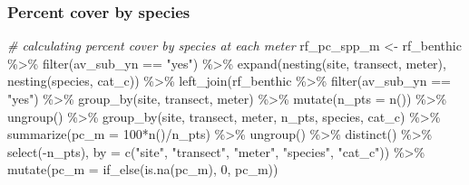\documentclass[
]{article}
\newenvironment{Shaded}{\begin{snugshade}}{\end{snugshade}}
\newcommand{\AttributeTok}[1]{\textcolor[rgb]{0.77,0.63,0.00}{#1}}
\newcommand{\CommentTok}[1]{\textcolor[rgb]{0.56,0.35,0.01}{\textit{#1}}}
\newcommand{\DecValTok}[1]{\textcolor[rgb]{0.00,0.00,0.81}{#1}}
\newcommand{\FunctionTok}[1]{\textcolor[rgb]{0.00,0.00,0.00}{#1}}
\newcommand{\NormalTok}[1]{#1}
\newcommand{\OtherTok}[1]{\textcolor[rgb]{0.56,0.35,0.01}{#1}}
\newcommand{\SpecialCharTok}[1]{\textcolor[rgb]{0.00,0.00,0.00}{#1}}
\newcommand{\StringTok}[1]{\textcolor[rgb]{0.31,0.60,0.02}{#1}}
\begin{document}
\hypertarget{percent-cover-by-species}{%
\subsubsection{Percent cover by
species}\label{percent-cover-by-species}}

\begin{Shaded}
\begin{Highlighting}[]
\CommentTok{\# calculating percent cover by species at each meter}
\NormalTok{rf\_pc\_spp\_m }\OtherTok{\textless{}{-}}\NormalTok{ rf\_benthic }\SpecialCharTok{\%\textgreater{}\%}
  \FunctionTok{filter}\NormalTok{(av\_sub\_yn }\SpecialCharTok{==} \StringTok{"yes"}\NormalTok{) }\SpecialCharTok{\%\textgreater{}\%}
  \FunctionTok{expand}\NormalTok{(}\FunctionTok{nesting}\NormalTok{(site, transect, meter), }\FunctionTok{nesting}\NormalTok{(species, cat\_c)) }\SpecialCharTok{\%\textgreater{}\%}
  \FunctionTok{left\_join}\NormalTok{(rf\_benthic }\SpecialCharTok{\%\textgreater{}\%} 
              \FunctionTok{filter}\NormalTok{(av\_sub\_yn }\SpecialCharTok{==} \StringTok{"yes"}\NormalTok{) }\SpecialCharTok{\%\textgreater{}\%} 
              \FunctionTok{group\_by}\NormalTok{(site, transect, meter) }\SpecialCharTok{\%\textgreater{}\%}
              \FunctionTok{mutate}\NormalTok{(}\AttributeTok{n\_pts =} \FunctionTok{n}\NormalTok{()) }\SpecialCharTok{\%\textgreater{}\%} 
              \FunctionTok{ungroup}\NormalTok{() }\SpecialCharTok{\%\textgreater{}\%}
              \FunctionTok{group\_by}\NormalTok{(site, transect, meter, n\_pts, species, cat\_c) }\SpecialCharTok{\%\textgreater{}\%}
              \FunctionTok{summarize}\NormalTok{(}\AttributeTok{pc\_m =} \DecValTok{100}\SpecialCharTok{*}\FunctionTok{n}\NormalTok{()}\SpecialCharTok{/}\NormalTok{n\_pts) }\SpecialCharTok{\%\textgreater{}\%}
              \FunctionTok{ungroup}\NormalTok{() }\SpecialCharTok{\%\textgreater{}\%}
              \FunctionTok{distinct}\NormalTok{() }\SpecialCharTok{\%\textgreater{}\%}
              \FunctionTok{select}\NormalTok{(}\SpecialCharTok{{-}}\NormalTok{n\_pts), }
            \AttributeTok{by =} \FunctionTok{c}\NormalTok{(}\StringTok{"site"}\NormalTok{, }\StringTok{"transect"}\NormalTok{, }\StringTok{"meter"}\NormalTok{, }\StringTok{"species"}\NormalTok{, }\StringTok{"cat\_c"}\NormalTok{)) }\SpecialCharTok{\%\textgreater{}\%}
  \FunctionTok{mutate}\NormalTok{(}\AttributeTok{pc\_m =} \FunctionTok{if\_else}\NormalTok{(}\FunctionTok{is.na}\NormalTok{(pc\_m), }\DecValTok{0}\NormalTok{, pc\_m))}


\end{Highlighting}
\end{Shaded}
\end{document}
